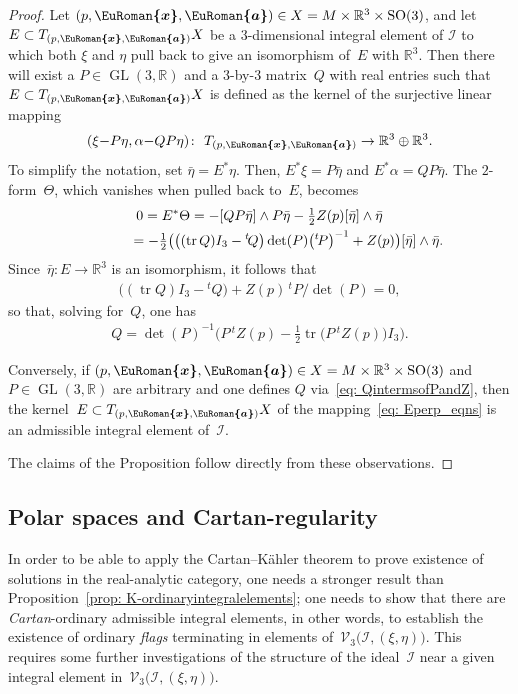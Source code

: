 \documentclass[11pt]{article}
\numberwithin{equation}{section}
\newcommand{\eurom}{\EuRoman}
\newcommand{\cI}{{\mathcal I}}
\newcommand{\cV}{{\mathcal V}}
\newcommand{\bbR}{{\mathbb R}}
\newcommand{\GL}{\operatorname{GL}}
\newcommand{\SO}{\operatorname{SO}}
\newcommand{\euroa}{\bm{\eurom{a}}}
\newcommand{\eurox}{\bm{\eurom{x}}}
\DeclareMathOperator{\tr}{tr}
\begin{document}
\begin{proof}
Let $(p,\eurox,\euroa)\in X=M\times\bbR^3\times\SO(3)$, and
let $E\subset T_{(p,\eurox,\euroa)} X$ be a $3$-dimensional integral element of $\cI$
to which both $\xi$ and $\eta$ pull back to give an isomorphism of~$E$
with $\mathbb{R}^3$. Then there will exist a $P\in\GL(3,\bbR)$
and a $3$-by-$3$ matrix~$Q$ with real entries
such that $E\subset T_{(p,\eurox,\euroa)} X$ is defined as the kernel of the surjective linear mapping
\begin{gather}\label{eq: Eperp_eqns}
(\xi{-}P \eta, \alpha{-}QP \eta)\colon \ T_{(p,\eurox,\euroa)}\to\bbR^3\oplus\bbR^3.
\end{gather}
To simplify the notation, set $\bar\eta = E^*\eta$.
Then, $E^*\xi = P\bar\eta$ and $E^*\alpha = QP\bar\eta$.
The $2$-form~$\Theta$, which vanishes
when pulled back to~$E$, becomes
\begin{gather*}
0 = E^*\Theta= -[QP \bar\eta]\wedge P \bar\eta-\tfrac12 Z(p) [\bar\eta]\wedge\bar\eta\\
\hphantom{0 = E^*\Theta}{} = -\tfrac12\bigl(\bigl((\tr Q)I_3-{}^t\!Q\bigr)\det(P)\big({}^t\!P\big)^{-1}
 + Z(p)\bigr) [\bar\eta]\wedge\bar\eta.
\end{gather*}
Since~$\bar\eta:E\to\bbR^3$ is an isomorphism, it follows that
\begin{gather*}
\bigl((\tr Q)I_3 - {}^t\!Q\bigr) + Z(p) \,{}^t\!P/\det(P) = 0,
\end{gather*}
so that, solving for~$Q$, one has
\begin{gather}\label{eq: QintermsofPandZ}
Q = \det(P)^{-1}\big(P \, {}^t\!Z(p) - \tfrac12 \tr\bigl(P\, {}^t\!Z(p)\bigr) I_3\big).
\end{gather}

Conversely, if $(p,\eurox,\euroa)\in X=M\times\bbR^3\times\SO(3)$
and~$P\in\GL(3,\bbR)$ are arbitrary
and one defines $Q$ via~\eqref{eq: QintermsofPandZ},
then the kernel~$E\subset T_{(p,\eurox,\euroa)}X$
of the mapping~\eqref{eq: Eperp_eqns}
is an admissible integral element of~$\cI$.

The claims of the Proposition follow directly from these observations.
\end{proof}

\subsection{Polar spaces and Cartan-regularity}
In order to be able to apply the Cartan--K\"ahler theorem to prove existence of solutions in the real-analytic category, one needs a stronger result than Proposition~\ref{prop: K-ordinaryintegralelements}; one needs to show that there are \emph{Cartan}-ordinary admissible integral elements, in other words, to establish the existence of ordinary \emph{flags} terminating in elements of~$\cV_3\bigl(\cI,(\xi,\eta)\bigr)$. This requires some further investigations of the structure of the ideal~$\cI$ near a given integral element in~$\cV_3\bigl(\cI,(\xi,\eta)\bigr)$.
\end{document}
